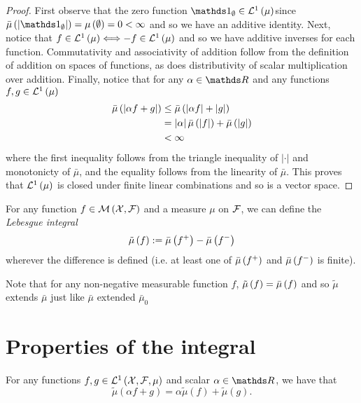 \begin{proof}
First observe that the zero function $\indicate_{\emptyset}\in\Lp 1{\mu}$since
$\lebInt{\mu}{\left|\indicate_{\emptyset}\right|}=\mu\left(\emptyset\right)=0<\infty$
and so we have an additive identity. Next, notice that $f\in\mathcal{L}^{1}\left(\mu\right)\Longleftrightarrow-f\in\mathcal{L}^{1}\left(\mu\right)$
and so we have additive inverses for each function. Commutativity
and associativity of addition follow from the definition of addition
on spaces of functions, as does distributivity of scalar multiplication
over addition. Finally, notice that for any $\alpha\in\R$ and any
functions $f,g\in\mathcal{L}^{1}\left(\mu\right)$
\begin{align*}
\bar{\mu}\left(\left|\alpha f+g\right|\right) & \leq\bar{\mu}\left(\left|\alpha f\right|+\left|g\right|\right)\\
 & =\left|\alpha\right|\bar{\mu}\left(\left|f\right|\right)+\bar{\mu}\left(\left|g\right|\right)\\
 & <\infty
\end{align*}
where the first inequality follows from the triangle inequality of
$|\cdot|$ and monotonicty of $\bar{\mu}$, and the equality follows
from the linearity of $\bar{\mu}$. This proves that $\mathcal{L}^{1}\left(\mu\right)$
is closed under finite linear combinations and so is a vector space.
\end{proof}
\begin{defn}
\label{def:integral}For any function $f\in\mathcal{M}\left(\mathcal{X},\mathcal{F}\right)$
and a measure $\mu$ on $\mathcal{F}$, we can define the \emph{Lebesgue integral}
\[
\tilde{\mu}\left(f\right):=\bar{\mu}\left(f^{+}\right)-\bar{\mu}\left(f^{-}\right)
\]
wherever the difference is defined (i.e. at least one of $\bar{\mu}\left(f^{+}\right)$
and $\bar{\mu}\left(f^{-}\right)$ is finite).
\end{defn}

\begin{rem*}
Note that for any non-negative measurable function $f$, $\tilde{\mu}\left(f\right)=\bar{\mu}\left(f\right)$
and so $\tilde{\mu}$ extends $\bar{\mu}$ just like $\bar{\mu}$
extended $\bar{\mu}_{0}$
\end{rem*}

\section{Properties of the integral}
\begin{prop}
\label{prop:linearityLebIntL1}For any functions $f,g\in\mathcal{L}^{1}\left(\mathcal{X},\mathcal{F},\mu\right)$
and scalar $\alpha\in\R$, we have that 
\[
\tilde{\mu}\left(\alpha f+g\right)=\alpha\tilde{\mu}\left(f\right)+\tilde{\mu}\left(g\right).
\]
\end{prop}

